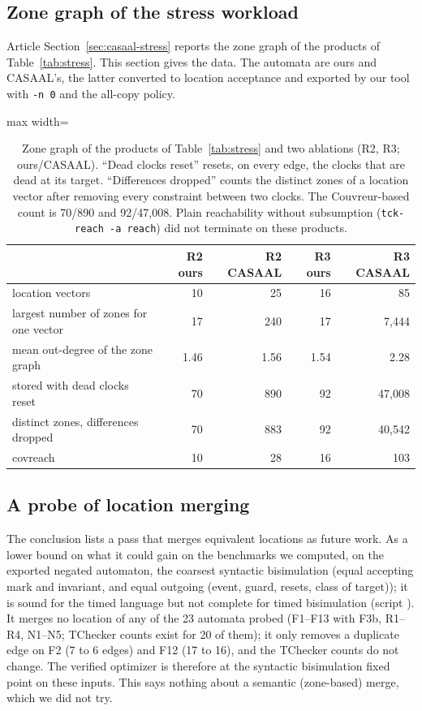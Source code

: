 \subsection{Zone graph of the stress workload}
\label{sec:zone-graph}
Article Section~\ref{sec:casaal-stress} reports the zone graph of the products of Table~\ref{tab:stress}. This section gives the data. The automata are ours and CASAAL's, the latter converted to location acceptance and exported by our tool with \texttt{-n 0} and the all-copy policy.

\begin{table}[tp]
\centering
\caption{Zone graph of the products of Table~\ref{tab:stress} and two ablations (R2, R3; ours/CASAAL). ``Dead clocks reset'' resets, on every edge, the clocks that are dead at its target. ``Differences dropped'' counts the distinct zones of a location vector after removing every constraint between two clocks. The Couvreur-based count is 70/890 and 92/47{,}008. Plain reachability without subsumption (\texttt{tck-reach -a reach}) did not terminate on these products.}
\label{tab:zone-detail}
\small
\begin{adjustbox}{max width=\textwidth}\begin{tabular}{@{}lrrrr@{}}
\toprule
 & R2 ours & R2 CASAAL & R3 ours & R3 CASAAL \\
\midrule
location vectors & 10 & 25 & 16 & 85 \\
largest number of zones for one vector & 17 & 240 & 17 & 7{,}444 \\
mean out-degree of the zone graph & 1.46 & 1.56 & 1.54 & 2.28 \\
stored with dead clocks reset & 70 & 890 & 92 & 47{,}008 \\
distinct zones, differences dropped & 70 & 883 & 92 & 40{,}542 \\
covreach & 10 & 28 & 16 & 103 \\
\bottomrule
\end{tabular}\end{adjustbox}
\end{table}

\subsection{A probe of location merging}
The conclusion lists a pass that merges equivalent locations as future work. As a lower bound on what it could gain on the benchmarks we computed, on the exported negated automaton, the coarsest syntactic bisimulation (equal accepting mark and invariant, and equal outgoing (event, guard, resets, class of target)); it is sound for the timed language but not complete for timed bisimulation (script ). It merges no location of any of the 23 automata probed (F1--F13 with F3b, R1--R4, N1--N5; TChecker counts exist for 20 of them); it only removes a duplicate edge on F2 (7 to 6 edges) and F12 (17 to 16), and the TChecker counts do not change. The verified optimizer is therefore at the syntactic bisimulation fixed point on these inputs. This says nothing about a semantic (zone-based) merge, which we did not try.

